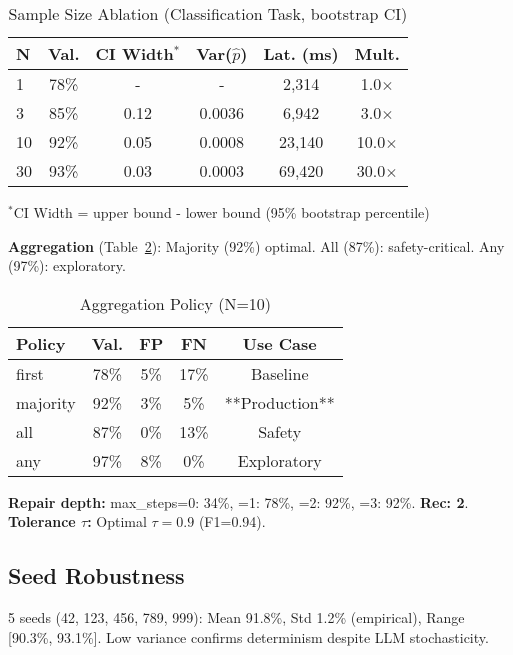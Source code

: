 \documentclass[sigconf]{acmart}
\begin{document}
\begin{table}[H]
\centering
\caption{Sample Size Ablation (Classification Task, bootstrap CI)}
\label{tab:ablation_n}
\scriptsize
\begin{tabular}{@{}lccccc@{}}
\toprule
\textbf{N} & \textbf{Val.} & \textbf{CI Width}\(^*\) & \textbf{Var(\(\hat{p}\))} & \textbf{Lat. (ms)} & \textbf{Mult.} \\
\midrule
1 & 78\% & - & - & 2,314 & 1.0\(\times\) \\
3 & 85\% & 0.12 & 0.0036 & 6,942 & 3.0\(\times\) \\
10 & 92\% & 0.05 & 0.0008 & 23,140 & 10.0\(\times\) \\
30 & 93\% & 0.03 & 0.0003 & 69,420 & 30.0\(\times\) \\
\bottomrule
\end{tabular}
\vspace{1mm}
\scriptsize\(^*\)CI Width = upper bound - lower bound (95\% bootstrap percentile)
\end{table}

\textbf{Aggregation} (Table~\ref{tab:ablation_agg}): Majority (92\%) optimal. All (87\%): safety-critical. Any (97\%): exploratory.

\begin{table}[H]
\centering
\caption{Aggregation Policy (N=10)}
\label{tab:ablation_agg}
\scriptsize
\begin{tabular}{@{}lcccc@{}}
\toprule
\textbf{Policy} & \textbf{Val.} & \textbf{FP} & \textbf{FN} & \textbf{Use Case} \\
\midrule
first & 78\% & 5\% & 17\% & Baseline \\
majority & 92\% & 3\% & 5\% & **Production** \\
all & 87\% & 0\% & 13\% & Safety \\
any & 97\% & 8\% & 0\% & Exploratory \\
\bottomrule
\end{tabular}
\end{table}

\textbf{Repair depth:} max\_steps=0: 34\%, =1: 78\%, =2: 92\%, =3: 92\%. \textbf{Rec: 2}. \textbf{Tolerance \( \tau \):} Optimal \( \tau = 0.9 \) (F1=0.94).

\subsection{Seed Robustness}

5 seeds (42, 123, 456, 789, 999): Mean 91.8\%, Std 1.2\% (empirical), Range [90.3\%, 93.1\%]. Low variance confirms determinism despite LLM stochasticity.
\end{document}
